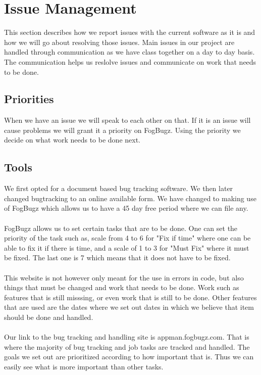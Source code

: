 \documentclass[a4paper,12pt,final]{article}
\begin{document}
\newpage
\section{Issue Management}
This section describes how we report issues with the current software as it is and how we will go about resolving those issues. 
Main issues in our project are handled through communication as we have class together on
a day to day basis. The communication helps us reslolve issues and communicate on work that needs to be done.
\subsection{Priorities}
When we have an issue we will speak to each other on that. If it is an issue will 
cause problems we  will grant it a priority  on FogBugz.
Using the priority we decide on what work needs to be done next.
\subsection{Tools}
We first opted for a document based bug tracking software. We then later 
changed bugtracking to an online available form. We have changed to making
use of FogBugz which allows us to have a 45 day free period where we can file any.\\
\textbf{\\}
FogBugz allows us to set certain tasks that are to be done. One can set the
priority of the task such as, scale from 4 to 6 for "Fix if time" where one can 
be able to fix it if there is time, and a scale of 1 to 3 for "Must Fix" where it
must be fixed. The last one is 7 which means that it does not have to be fixed.\\
\textbf{\\}
This website is not however only meant for the use in errors in code, but also 
things that must be changed and work that needs to be done. Work such as
features that is still misssing, or even work that is still to be done. Other features that are used are the dates where we set out dates in which we believe that item should be done and handled.\\
\textbf{\\}
Our link to the bug tracking and handling site is appman.fogbugz.com. That
is where the majority of bug tracking and job tasks are tracked and handled.
The goals we set out are prioritized according to how important that is. Thus
we can easily see what is more important than other tasks. 
\end{document}
